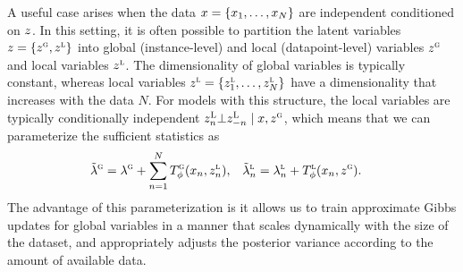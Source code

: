 \documentclass{article}
\theoremstyle{definition}
\begin{document}
A useful case arises when the data $x = \{x_1, \ldots, x_N\}$ are independent conditioned on $z$. In this setting, it is often possible to partition the latent variables $z = \{z^\textsc{g}, z^\textsc{l}\}$ into global (instance-level) and local (datapoint-level) variables $z^{\textsc{g}}$ and local variables $z^{\textsc{l}}$. The dimensionality of global variables is typically constant, whereas local variables $z^\textsc{l} = \{z^\textsc{l}_1, \ldots, z^\textsc{l}_N\}$ have a dimensionality that increases with the data $N$. For models with this structure, the local variables are typically conditionally independent $z^\textsc{L}_n \bot z^\textsc{L}_{-n} \mid x, z^\textsc{g}$, which means that we can parameterize the sufficient statistics as
\begin{align*}
    \vspace{-1.0em}
    \tilde{\lambda}^\textsc{g}
    &= 
    \lambda^\textsc{g} 
    + 
    \sum_{n=1}^N 
    T^\textsc{g}_\f(\x_n, z^\textsc{l}_{n}),
    &
    \tilde{\lambda}^\textsc{l}_n
    &=
    \lambda^\textsc{l}_n + T^\textsc{l}_\f(\x_n, \z^\textsc{g}).
    \vspace{-1.0em}
\end{align*}
The advantage of this parameterization is it allows us to train approximate Gibbs updates for global variables in a manner that scales dynamically with the size of the dataset, and appropriately adjusts the posterior variance according to the amount of available data.
\end{document}
